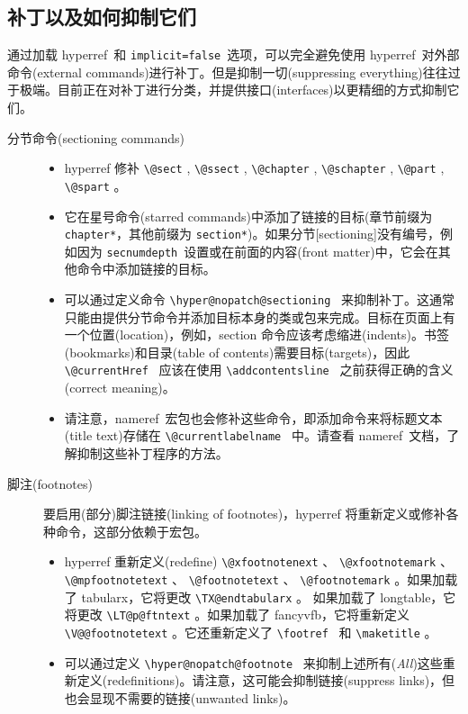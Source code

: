 \documentclass{article}
\newcommand*{\cs}[1]{%
  \texttt{\textbackslash #1}%
}
\newcommand*{\xpackage}[1]{\textsf{#1}}
\begin{document}
\subsection[补丁以及如何抑制它们]{\heiti 补丁以及如何抑制它们}

通过加载 \xpackage{hyperref}\ 和 \texttt{implicit=false}\ 选项，可以完全避免使用 \xpackage{hyperref}\ 对外部命令(external commands)进行补丁。但是抑制一切(suppressing everything)往往过于极端。目前正在对补丁进行分类，并提供接口(interfaces)以更精细的方式抑制它们。

\begin{description}
  \item[分节命令(sectioning commands)] \hfil
        \begin{itemize}
          \item \xpackage{hyperref} 修补 \cs{@sect}, \cs{@ssect}, \cs{@chapter}, \cs{@schapter}, \cs{@part}, \cs{@spart}。
          \item 它在星号命令(starred commands)中添加了链接的目标(章节前缀为 \texttt{chapter*}，其他前缀为 \texttt{section*})。如果分节[sectioning]没有编号，例如因为 \texttt{secnumdepth}\ 设置或在前面的内容(front matter)中，它会在其他命令中添加链接的目标。
          \item 可以通过定义命令 \cs{hyper@nopatch@sectioning}\ 来抑制补丁。这通常只能由提供分节命令并添加目标本身的类或包来完成。目标在页面上有一个位置(location)，例如，section 命令应该考虑缩进(indents)。书签(bookmarks)和目录(table of contents)需要目标(targets)，因此 \cs{@currentHref}\ 应该在使用 \cs{addcontentsline}\ 之前获得正确的含义(correct meaning)。
          \item 请注意，\xpackage{nameref}\ 宏包也会修补这些命令，即添加命令来将标题文本(title text)存储在 \cs{@currentlabelname}\ 中。请查看 \xpackage{nameref}\ 文档，了解抑制这些补丁程序的方法。
        \end{itemize}

  \item[脚注(footnotes)] 要启用(部分)脚注链接(linking of footnotes)，\xpackage{hyperref} 将重新定义或修补各种命令，这部分依赖于宏包。

        \begin{itemize}
          \item \xpackage{hyperref} 重新定义(redefine) \cs{@xfootnotenext}、\cs{@xfootnotemark}、\cs{@mpfootnotetext}、\cs{@footnotetext}、\cs{@footnotemark}。如果加载了 \xpackage{tabularx}，它将更改 \cs{TX@endtabularx}。 如果加载了 \xpackage{longtable}，它将更改 \cs{LT@p@ftntext}。如果加载了 \xpackage{fancyvfb}，它将重新定义 \cs{V@@footnotetext}。它还重新定义了\cs{footref}\ 和 \cs{maketitle}。
          \item 可以通过定义 \cs{hyper@nopatch@footnote}\ 来抑制上述{\kaiti 所有}(\emph{All})这些重新定义(redefinitions)。请注意，这可能会抑制链接(suppress links)，但也会显现不需要的链接(unwanted links)。
        \end{itemize}


\end{description}
\end{document}
